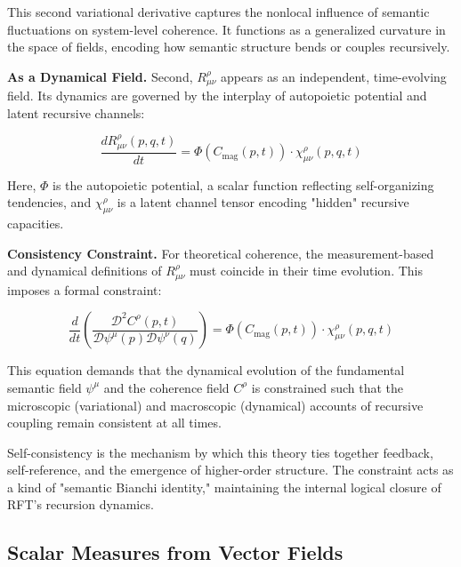 This second variational derivative captures the nonlocal influence of semantic fluctuations on system-level coherence. It functions as a generalized curvature in the space of fields, encoding how semantic structure bends or couples recursively.

\textbf{As a Dynamical Field.} Second, \(R^\rho_{\mu\nu}\) appears as an independent, time-evolving field. Its dynamics are governed by the interplay of autopoietic potential and latent recursive channels:

\begin{equation}
\label{eq:R_dynamical}
\frac{dR^\rho_{\mu\nu}(p, q, t)}{dt} = \Phi(C_{\mathrm{mag}}(p, t)) \cdot \chi^\rho_{\mu\nu}(p, q, t)
\end{equation}

Here, \(\Phi\) is the autopoietic potential, a scalar function reflecting self-organizing tendencies, and \(\chi^\rho_{\mu\nu}\) is a latent channel tensor encoding "hidden" recursive capacities.

\textbf{Consistency Constraint.} For theoretical coherence, the measurement-based and dynamical definitions of \(R^\rho_{\mu\nu}\) must coincide in their time evolution. This imposes a formal constraint:

\begin{equation}
\label{eq:R_consistency}
\frac{d}{dt} \left( \frac{\mathcal{D}^2 C^\rho(p, t)}{\mathcal{D} \psi^\mu(p) \mathcal{D} \psi^\nu(q)} \right) = \Phi(C_{\mathrm{mag}}(p, t)) \cdot \chi^\rho_{\mu\nu}(p, q, t)
\end{equation}

This equation demands that the dynamical evolution of the fundamental semantic field \(\psi^\mu\) and the coherence field \(C^\rho\) is constrained such that the microscopic (variational) and macroscopic (dynamical) accounts of recursive coupling remain consistent at all times.

Self-consistency is the mechanism by which this theory ties together feedback, self-reference, and the emergence of higher-order structure. The constraint acts as a kind of "semantic Bianchi identity," maintaining the internal logical closure of RFT's recursion dynamics.


\subsection{Scalar Measures from Vector Fields}
\label{2.4.8:scalar_measures_from_vector_fields}

